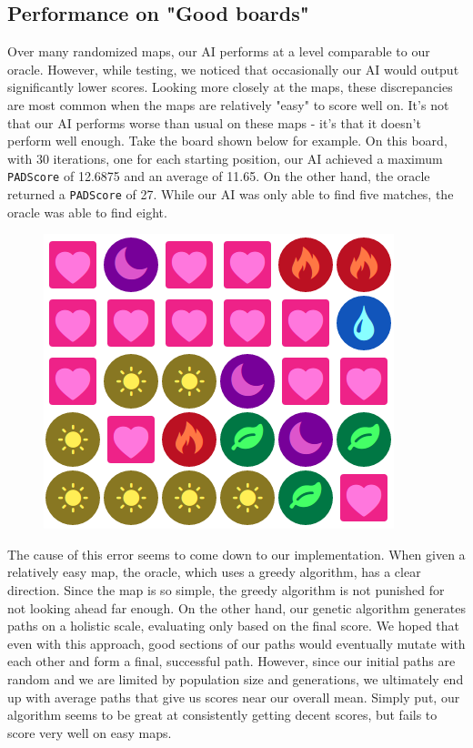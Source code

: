 \documentclass[journal,final,letterpaper,11pt]{IEEEtran}
\begin{document}
\subsection{Performance on "Good boards"}
Over many randomized maps, our AI performs at a level comparable to our oracle. However, while testing, we noticed that occasionally our AI would output significantly lower scores. Looking more closely at the maps, these discrepancies are most common when the maps are relatively "easy" to score well on. It's not that our AI performs worse than usual on these maps - it's that it doesn't perform well enough. Take the board shown below for example. On this board, with 30 iterations, one for each starting position, our AI achieved a maximum \texttt{PADScore} of 12.6875 and an average of 11.65. On the other hand, the oracle returned a \texttt{PADScore} of 27. While our AI was only able to find five matches, the oracle was able to find eight. 

\begin{figure}[h]
\centering
\includegraphics[scale=0.5]{Pad_Board_1.png}
\end{figure}

The cause of this error seems to come down to our implementation. When given a relatively easy map, the oracle, which uses a greedy algorithm, has a clear direction. Since the map is so simple, the greedy algorithm is not punished for not looking ahead far enough. On the other hand, our genetic algorithm generates paths on a holistic scale, evaluating only based on the final score. We hoped that even with this approach, good sections of our paths would eventually mutate with each other and form a final, successful path. However, since our initial paths are random and we are limited by population size and generations, we ultimately end up with average paths that give us scores near our overall mean. Simply put, our algorithm seems to be great at consistently getting decent scores, but fails to score very well on easy maps.
\end{document}
